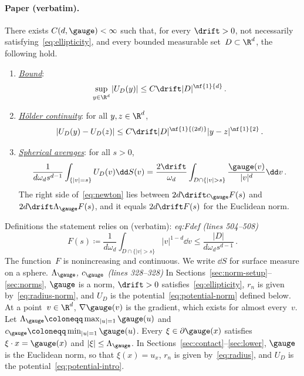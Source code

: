 \paragraph{Paper (verbatim).}
\begin{lemma}\label{lem:geometry}
There exists $C(d,\gauge)<\infty$ such that, for every $\drift>0$, not necessarily satisfying~\eqref{eq:ellipticity}, and every bounded measurable set~$D\subset\R^d$, the following hold.
\begin{enumerate}[label=\textup{(\roman*)}]
\item \underline{\emph{Bound}}:
\begin{equation}\label{eq:potential-bound}
\sup_{y\in\R^d}|U_D(y)|\leq C\drift|D|^{\nf{1}{d}}\, .
\end{equation}
\item \underline{\emph{H\"older continuity}}: for all $y,z\in\R^d$,
\begin{equation}\label{eq:holder}
|U_D(y)-U_D(z)|\leq C\drift|D|^{\nf{1}{(2d)}}|y-z|^{\nf{1}{2}}\, .
\end{equation}
\item \underline{\emph{Spherical averages}}: for all $s>0$,
\begin{equation}\label{eq:newton}
\frac1{d\omega_ds^{d-1}}\int_{\{|v|=s\}}U_D(v)\dd S(v)
=\frac{2\drift}{\omega_d}\int_{D\cap\{|v|>s\}}\frac{\gauge(v)}{|v|^d}\dd v\, .
\end{equation}
The right side of~\eqref{eq:newton} lies between $2d\drift c_\gauge F(s)$ and $2d\drift\Lambda_\gauge F(s)$, and it equals $2d\drift F(s)$ for the Euclidean norm.
\end{enumerate}
\end{lemma}
Definitions the statement relies on (verbatim):
\textit{eq:Fdef (lines 504--508)}
\begin{equation}\label{eq:Fdef}
F(s)\coloneqq\frac1{d\omega_d}\int_{D\cap\{|v|>s\}}|v|^{1-d}\dd v
\leq\frac{|D|}{d\omega_ds^{d-1}}\, .
\end{equation}
The function~$F$ is nonincreasing and continuous. We write $\dd S$ for surface measure on a sphere.
\textit{$\Lambda_\gauge$, $c_\gauge$ (lines 328--328)}
In Sections~\ref{sec:norm-setup}--\ref{sec:norms}, $\gauge$ is a norm, $\drift>0$ satisfies~\eqref{eq:ellipticity}, $r_n$ is given by~\eqref{eq:radius-norm}, and $U_D$ is the potential~\eqref{eq:potential-norm} defined below. At a point~$v\in\R^d$, $\nabla\gauge(v)$ is the gradient, which exists for almost every~$v$. Let $\Lambda_\gauge\coloneqq\max_{|u|=1}\gauge(u)$ and $c_\gauge\coloneqq\min_{|u|=1}\gauge(u)$. Every $\xi\in\partial\gauge(x)$ satisfies $\xi\cdot x=\gauge(x)$ and $|\xi|\leq\Lambda_\gauge$. In Sections~\ref{sec:contact}--\ref{sec:lower}, $\gauge$ is the Euclidean norm, so that $\xi(x)=u_x$, $r_n$ is given by~\eqref{eq:radius}, and $U_D$ is the potential~\eqref{eq:potential-intro}.
